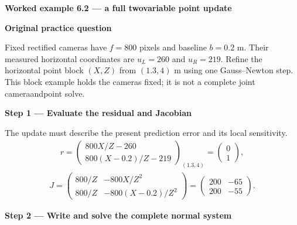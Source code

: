 \documentclass[letterpaper,11pt,english,openany,oneside]{jupyterBook}
\begin{document}
\begin{TextbookBox}
\textbf{Worked example 6.2 — a full two\sphinxhyphen{}variable point update}\par\smallskip

\par\medskip\textbf{Original practice question}\par\smallskip

\sphinxAtStartPar
Fixed rectified cameras have \(f=800\) pixels and baseline \(b=0.2\) m. Their measured horizontal coordinates are \(u_L=260\) and \(u_R=219\). Refine the horizontal point block \((X,Z)\) from \((1.3,4)\) m using one Gauss–Newton step. This block example holds the cameras fixed; it is not a complete joint camera\sphinxhyphen{}and\sphinxhyphen{}point solve.

\par\medskip

\par\medskip{}
{\color{QuizStepRed}\bfseries Step 1 — Evaluate the residual and Jacobian}\par\smallskip

\sphinxAtStartPar
{} The update must describe the present prediction error and its local sensitivity.
{\color{QuizMathBlue} \begin{equation*}
\begin{split}r=\begin{pmatrix}800X/Z-260\\800(X-0.2)/Z-219\end{pmatrix}_{(1.3,4)}=\begin{pmatrix}0\\1\end{pmatrix},\end{split}
\end{equation*}}{\color{QuizMathBlue} \begin{equation*}
\begin{split}J=\begin{pmatrix}800/Z&-800X/Z^2\\800/Z&-800(X-0.2)/Z^2\end{pmatrix}=\begin{pmatrix}200&-65\\200&-55\end{pmatrix}.\end{split}
\end{equation*}}
\par

\par\medskip{}
{\color{QuizStepRed}\bfseries Step 2 — Write and solve the complete normal system}\par\smallskip


\end{TextbookBox}
\end{document}
